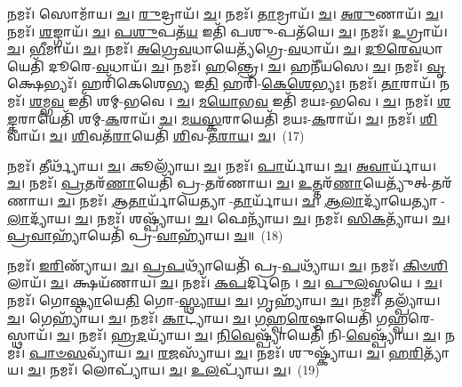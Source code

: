 𑌨𑌮𑌃᳴। 𑌸𑍋𑌮𑌾᳴𑌯। \ul{𑌚}\-। \ul{𑌰𑍁}\-𑌦𑍍𑌰𑌾𑌯᳴। \ul{𑌚}\-। 
𑌨𑌮𑌃᳴। \ul{𑌤𑌾}\-𑌮𑍍𑌰𑌾𑌯᳴। \ul{𑌚}\-। \ul{𑌅}\-\-\ul{𑌰𑍁}\-𑌣𑌾𑌯᳴। \ul{𑌚}\-। 
𑌨𑌮𑌃᳴। \ul{𑌶}\-𑌙𑍍𑌗𑌾𑌯᳴। \ul{𑌚}\-। \ul{𑌪}\-\-\ul{𑌶𑍁}\-𑌪𑌤᳴\-\ul{𑌯} 𑌇𑌤𑌿᳴ 𑌪𑌶𑍁-𑌪𑌤᳴𑌯𑍇। \ul{𑌚}\-। 
𑌨𑌮𑌃᳴। \ul{𑌉}\-𑌗𑍍𑌰𑌾𑌯᳴। \ul{𑌚}\-। \ul{𑌭𑍀}\-𑌮𑌾𑌯᳴। \ul{𑌚}\-। 
𑌨𑌮𑌃᳴। \ul{𑌅}\-\-\ul{𑌗𑍍𑌰𑍇}\-\-\ul{𑌵}\-𑌧𑌾𑌯𑍇𑌤𑍍𑌯᳴𑌗𑍍𑌰𑍇-\-\ul{𑌵}\-𑌧𑌾𑌯᳴। \ul{𑌚}\-। \ul{𑌦𑍂}\-\-\ul{𑌰𑍇}\-\-\ul{𑌵}\-𑌧𑌾𑌯𑍇𑌤𑌿᳴ 𑌦𑍂𑌰𑍇-\-\ul{𑌵}\-𑌧𑌾𑌯᳴। \ul{𑌚}\-। 
𑌨𑌮𑌃᳴। \ul{𑌹}\-𑌨𑍍𑌤𑍍𑌰𑍇। \ul{𑌚}\-। 𑌹𑌨𑍀᳴𑌯𑌸𑍇। \ul{𑌚}\-। 
𑌨𑌮𑌃᳴। \ul{𑌵𑍃}\-𑌕𑍍𑌷𑍇𑌭𑍍𑌯𑌃᳴। 𑌹𑌰𑌿᳴𑌕𑍇𑌶𑍇\-\ul{𑌭𑍍𑌯} 𑌇\-\ul{𑌤𑌿} 𑌹𑌰𑌿᳴-\-\ul{𑌕𑍇}\-\-\ul{𑌶𑍇}\-\-\ul{𑌭𑍍𑌯𑌃}\-। 
𑌨𑌮𑌃᳴। \ul{𑌤𑌾}\-𑌰𑌾𑌯᳴। 𑌨𑌮𑌃᳴। \ul{𑌶}\-𑌮𑍍𑌭\-\ul{𑌵} 𑌇𑌤𑌿᳴ 𑌶𑌮𑍍-𑌭𑌵𑍇। \ul{𑌚}\-। \ul{𑌮}\-\-\ul{𑌯𑍋}\-𑌭\-\ul{𑌵} 𑌇𑌤𑌿᳴ 𑌮𑌯𑌃-𑌭𑌵𑍇। \ul{𑌚}\-। 
𑌨𑌮𑌃᳴। \ul{𑌶}\-\-\ul{𑌙𑍍𑌕}\-𑌰𑌾𑌯𑍇𑌤𑌿᳴ 𑌶𑌮𑍍-\-\ul{𑌕}\-𑌰𑌾𑌯᳴। \ul{𑌚}\-। \ul{𑌮}\-\-\ul{𑌯}\-\-\ul{𑌸𑍍𑌕}\-𑌰𑌾𑌯𑍇𑌤𑌿᳴ 𑌮𑌯𑌃-\-\ul{𑌕}\-𑌰𑌾𑌯᳴। \ul{𑌚}\-। 
𑌨𑌮𑌃᳴। \ul{𑌶𑌿}\-𑌵𑌾𑌯᳴। \ul{𑌚}\-। \ul{𑌶𑌿}\-𑌵𑌤᳴\-\ul{𑌰𑌾}\-𑌯𑍇𑌤𑌿᳴ \ul{𑌶𑌿}\-𑌵-\-\ul{𑌤}\-\-\ul{𑌰𑌾}\-\-\ul{𑌯}\-। \ul{𑌚}\-।~(17)


𑌨𑌮𑌃᳴। 𑌤𑍀𑌰𑍍𑌥𑍍𑌯𑌾᳴𑌯। \ul{𑌚}\-। 𑌕𑍂𑌲𑍍𑌯𑌾᳴𑌯। \ul{𑌚}\-। 
𑌨𑌮𑌃᳴। \ul{𑌪𑌾}\-𑌰𑍍𑌯𑌾᳴𑌯। \ul{𑌚}\-। \ul{𑌅}\-\-\ul{𑌵𑌾}\-𑌰𑍍𑌯𑌾᳴𑌯। \ul{𑌚}\-। 
𑌨𑌮𑌃᳴। \ul{𑌪𑍍𑌰}\-𑌤𑌰᳴\-\ul{𑌣𑌾}\-𑌯𑍇𑌤𑌿᳴ 𑌪𑍍𑌰-𑌤𑌰᳴𑌣𑌾𑌯। \ul{𑌚}\-। \ul{𑌉}\-\-\ul{𑌤𑍍𑌤}\-𑌰᳴\-\ul{𑌣𑌾}\-𑌯𑍇𑌤𑍍𑌯𑍁᳴𑌤𑍍-𑌤𑌰᳴𑌣𑌾𑌯। \ul{𑌚}\-। 
𑌨𑌮𑌃᳴। \ul{𑌆}\-\-\ul{𑌤𑌾}\-𑌰𑍍𑌯𑌾᳴𑌯𑍇𑌤𑍍𑌯𑌾-\-\ul{𑌤𑌾}\-𑌰𑍍𑌯𑌾᳴𑌯। \ul{𑌚}\-। \ul{𑌆}\-\-\ul{𑌲𑌾}\-𑌦𑍍𑌯𑌾᳴𑌯𑍇𑌤𑍍𑌯𑌾-\-\ul{𑌲𑌾}\-𑌦𑍍𑌯𑌾᳴𑌯। \ul{𑌚}\-। 
𑌨𑌮𑌃᳴। 𑌶𑌷𑍍𑌪𑍍𑌯𑌾᳴𑌯। \ul{𑌚}\-। 𑌫𑍇𑌨𑍍𑌯𑌾᳴𑌯। \ul{𑌚}\-। 
𑌨𑌮𑌃᳴। \ul{𑌸𑌿}\-\-\ul{𑌕}\-𑌤𑍍𑌯𑌾᳴𑌯। \ul{𑌚}\-। \ul{𑌪𑍍𑌰}\-\-\ul{𑌵𑌾}\-𑌹𑍍𑌯𑌾᳴𑌯𑍇𑌤𑌿᳴ 𑌪𑍍𑌰-\-\ul{𑌵𑌾}\-𑌹𑍍𑌯𑌾᳴𑌯। \ul{𑌚}\-॥~(18)


𑌨𑌮𑌃᳴। \ul{𑌇}\-\-\ul{𑌰𑌿}\-𑌣𑍍𑌯𑌾᳴𑌯। \ul{𑌚}\-। \ul{𑌪𑍍𑌰}\-\-\ul{𑌪}\-𑌥𑍍𑌯𑌾᳴𑌯𑍇𑌤𑌿᳴ 𑌪𑍍𑌰-\-\ul{𑌪}\-𑌥𑍍𑌯𑌾᳴𑌯। \ul{𑌚}\-। 
𑌨𑌮𑌃᳴। \ul{𑌕𑌿}\-\-\ul{𑍞}\-\-\ul{𑌶𑌿}\-𑌲𑌾𑌯᳴। \ul{𑌚}\-। 𑌕𑍍𑌷𑌯᳴𑌣𑌾𑌯। \ul{𑌚}\-। 
𑌨𑌮𑌃᳴। \ul{𑌕}\-\-\ul{𑌪}\-𑌰𑍍𑌦𑌿𑌨𑍇। \ul{𑌚}\-। \ul{𑌪𑍁}\-\-\ul{𑌲}\-𑌸𑍍𑌤𑌯𑍇। \ul{𑌚}\-। 
𑌨𑌮𑌃᳴। 𑌗𑍋\-\ul{𑌷𑍍𑌠𑍍𑌯𑌾}\-𑌯𑍇\-\ul{𑌤𑌿} 𑌗𑍋-\-\ul{𑌸𑍍𑌥𑍍𑌯𑌾}\-\-\ul{𑌯}\-। \ul{𑌚}\-। 𑌗𑍃𑌹𑍍𑌯𑌾᳴𑌯। \ul{𑌚}\-। 
𑌨𑌮𑌃᳴। 𑌤𑌲𑍍𑌪𑍍𑌯𑌾᳴𑌯। \ul{𑌚}\-। 𑌗𑍇𑌹𑍍𑌯𑌾᳴𑌯। \ul{𑌚}\-। 
𑌨𑌮𑌃᳴। \ul{𑌕𑌾}\-𑌟𑍍𑌯𑌾᳴𑌯। \ul{𑌚}\-। \ul{𑌗}\-\-\ul{𑌹𑍍𑌵}\-\-\ul{𑌰𑍇}\-𑌷𑍍𑌠𑌾𑌯𑍇𑌤𑌿᳴ 𑌗𑌹𑍍𑌵𑌰𑍇-𑌸𑍍𑌥𑌾𑌯᳴। \ul{𑌚}\-। 
𑌨𑌮𑌃᳴। \ul{𑌹𑍍𑌰}\-\-\ul{𑌦}\-𑌯𑍍𑌯𑌾᳴𑌯। \ul{𑌚}\-। \ul{𑌨𑌿}\-\-\ul{𑌵𑍇}\-𑌷𑍍𑌪𑍍𑌯𑌾᳴𑌯𑍇𑌤𑌿᳴ 𑌨𑌿-\-\ul{𑌵𑍇}\-𑌷𑍍𑌪𑍍𑌯𑌾᳴𑌯। \ul{𑌚}\-। 
𑌨𑌮𑌃᳴। \ul{𑌪𑌾}\-\-\ul{𑍞}\-\-\ul{𑌸}\-𑌵𑍍𑌯𑌾᳴𑌯। \ul{𑌚}\-। \ul{𑌰}\-\-\ul{𑌜}\-𑌸𑍍𑌯𑌾᳴𑌯। \ul{𑌚}\-। 
𑌨𑌮𑌃᳴। 𑌶𑍁𑌷𑍍𑌕𑍍𑌯𑌾᳴𑌯। \ul{𑌚}\-। \ul{𑌹}\-\-\ul{𑌰𑌿}\-𑌤𑍍𑌯𑌾᳴𑌯। \ul{𑌚}\-। 
𑌨𑌮𑌃᳴। 𑌲𑍋𑌪𑍍𑌯𑌾᳴𑌯। \ul{𑌚}\-। \ul{𑌉}\-\-\ul{𑌲}\-𑌪𑍍𑌯𑌾᳴𑌯। \ul{𑌚}\-।~(19)


